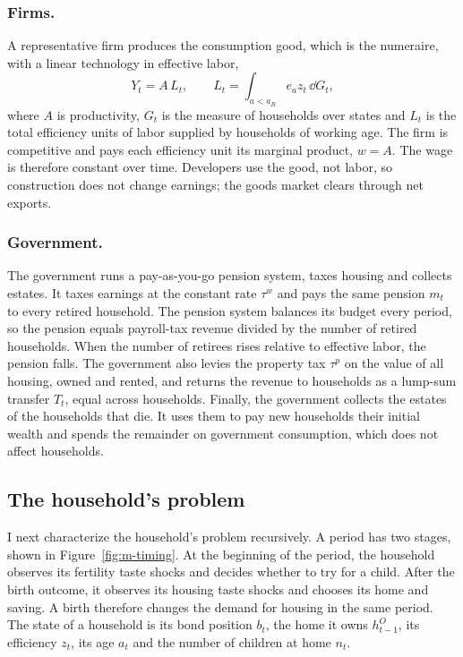 \subsubsection*{Firms.}
A representative firm produces the consumption good, which is the numeraire,
with a linear technology in effective labor,
\begin{equation*}
 Y_t=A\,L_t,\qquad L_t=\int_{a<a_R}e_az_t\,\dd G_t,
\end{equation*}
where $A$ is productivity, $G_t$ is the measure of households over states and
$L_t$ is the total efficiency units of labor supplied by households of working
age. The firm is competitive and pays each efficiency unit its marginal
product, $w=A$. The wage is therefore constant over time. Developers use the
good, not labor, so construction does not change earnings; the goods market
clears through net exports.

\subsubsection*{Government.}
The government runs a pay-as-you-go pension system, taxes housing and collects
estates. It taxes
earnings at the constant rate $\tau^w$ and pays the same pension $m_t$ to
every retired household. The pension system balances its budget every period,
so the pension equals payroll-tax revenue divided by the number of retired
households. When the number of retirees rises relative to effective labor, the
pension falls. The government also levies the property tax $\tau^p$ on the
value of all housing, owned and rented, and returns the revenue to households
as a lump-sum transfer $T_t$, equal across households. Finally, the government
collects the estates of the households that die. It uses them to pay new
households their initial wealth and spends the remainder on government
consumption, which does not affect households.

\subsection{The household's problem}
\label{sec:m-household}

I next characterize the household's problem recursively. A period has two
stages, shown in Figure~\ref{fig:m-timing}. At the beginning of the period,
the household observes its fertility taste shocks and decides whether to try
for a child. After the birth outcome, it observes its housing taste shocks and
chooses its home and saving. A birth therefore changes the demand for housing
in the same period. The state of a household is its bond position $b_t$, the
home it owns $h^O_{t-1}$, its efficiency $z_t$, its age $a_t$ and the number of
children at home $n_t$.

